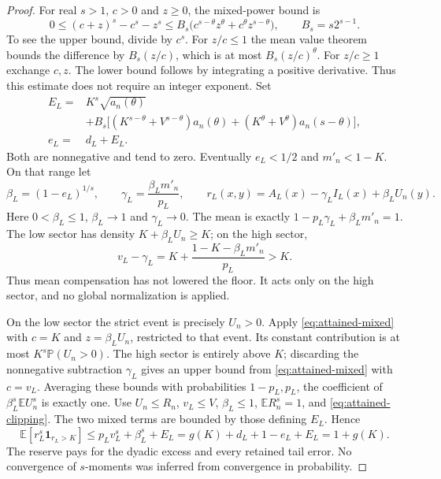 \documentclass[11pt]{article}
\begin{document}
\begin{proof}
For real $s>1$, $c>0$ and $z\ge0$, the mixed-power bound is
\begin{equation}\label{eq:attained-mixed}
 0\le(c+z)^s-c^s-z^s
 \le B_s\bigl(c^{s-\theta}z^\theta+c^\theta z^{s-\theta}\bigr),
 \qquad B_s=s2^{s-1}.
\end{equation}
To see the upper bound, divide by $c^s$. For $z/c\le1$ the
mean value theorem bounds the difference by $B_s(z/c)$, which is
at most $B_s(z/c)^\theta$. For $z/c\ge1$ exchange $c,z$.
The lower bound follows by integrating a positive derivative.
Thus this estimate does not require an integer exponent.
Set
\begin{align*}
 E_L={}&K^s\sqrt{a_n(\theta)}\\
 &+B_s\bigl[(K^{s-\theta}+V^{s-\theta})a_n(\theta)
 +(K^\theta+V^\theta)a_n(s-\theta)\bigr],\\
 e_L={}&d_L+E_L.
\end{align*}
Both are nonnegative and tend to zero. Eventually $e_L<1/2$ and
$m'_n<1-K$. On that range let
\begin{equation}\label{eq:attained-density}
 \beta_L=(1-e_L)^{1/s},\qquad
 \gamma_L=\frac{\beta_Lm'_n}{p_L},\qquad
 r_L(x,y)=A_L(x)-\gamma_L I_L(x)+\beta_LU_n(y).
\end{equation}
Here $0<\beta_L\le1$, $\beta_L\to1$ and $\gamma_L\to0$.
The mean is exactly $1-p_L\gamma_L+\beta_Lm'_n=1$.
The low sector has density $K+\beta_LU_n\ge K$; on the high sector,
\[
 v_L-\gamma_L=K+\frac{1-K-\beta_Lm'_n}{p_L}>K.
\]
Thus mean compensation has not lowered the floor. It acts only
on the high sector, and no global normalization is applied.

On the low sector the strict event is precisely $U_n>0$. Apply
\eqref{eq:attained-mixed} with $c=K$ and $z=\beta_LU_n$, restricted
to that event. Its constant contribution is at most
$K^s\mathbb P(U_n>0)$. The high sector is entirely above $K$;
discarding the nonnegative subtraction $\gamma_L$ gives an upper
bound from \eqref{eq:attained-mixed} with $c=v_L$.
Averaging these bounds with probabilities $1-p_L,p_L$, the
coefficient of $\beta_L^s\mathbb EU_n^s$ is exactly one.
Use $U_n\le R_n$, $v_L\le V$, $\beta_L\le1$,
$\mathbb ER_n^s=1$, and \eqref{eq:attained-clipping}. The two mixed
terms are bounded by those defining $E_L$. Hence
\begin{equation}\label{eq:attained-exact-budget}
 \mathbb E[r_L^s\mathbf1_{r_L>K}]
 \le p_Lv_L^s+\beta_L^s+E_L
 =g(K)+d_L+1-e_L+E_L=1+g(K).
\end{equation}
The reserve pays for the dyadic excess and every retained tail error.
No convergence of $s$-moments was inferred from convergence in probability.


\end{proof}
\end{document}
